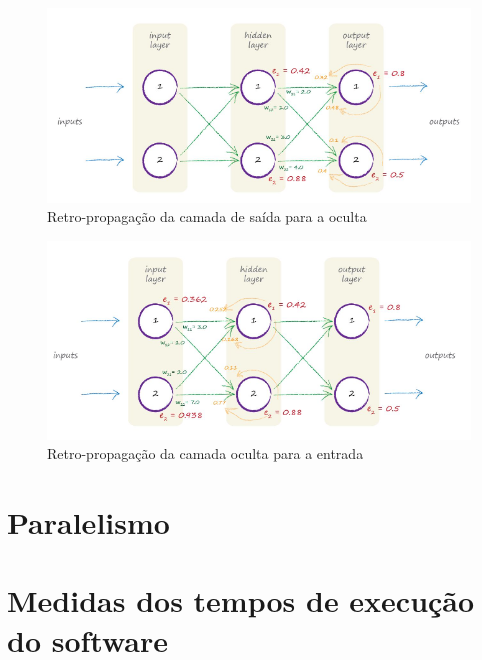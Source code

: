 \begin{apendicesenv}
		\begin{figure}[H]
			\centering
			\caption{Retro-propagação da camada de saída para a oculta}
			\label{fig:backpropagationerros1}
			\includegraphics[width=0.7\linewidth]{images/TEMPbackpropagationErros1}
		\end{figure}
		
		
		\begin{figure}[H]
			\centering
			\caption{Retro-propagação da camada oculta para a entrada}
			\label{fig:backpropagationerros2}
			\includegraphics[width=0.7\linewidth]{images/TEMPbackpropagationErros2}
		\end{figure}
		
	\chapter{Paralelismo}
		\par 
		
		\chapter{Medidas dos tempos de execução do software}
		
		
\end{apendicesenv}









